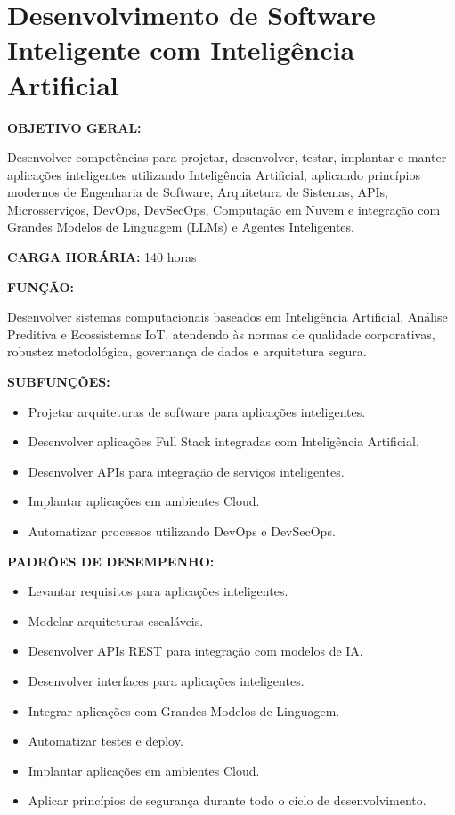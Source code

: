 \section{Desenvolvimento de Software Inteligente com Inteligência Artificial}

\textbf{OBJETIVO GERAL:}

Desenvolver competências para projetar, desenvolver, testar, implantar e manter aplicações inteligentes utilizando Inteligência Artificial, aplicando princípios modernos de Engenharia de Software, Arquitetura de Sistemas, APIs, Microsserviços, DevOps, DevSecOps, Computação em Nuvem e integração com Grandes Modelos de Linguagem (LLMs) e Agentes Inteligentes.

\textbf{CARGA HORÁRIA:} 140 horas

\textbf{FUNÇÃO:}

Desenvolver sistemas computacionais baseados em Inteligência Artificial, Análise Preditiva e Ecossistemas IoT, atendendo às normas de qualidade corporativas, robustez metodológica, governança de dados e arquitetura segura.

\textbf{SUBFUNÇÕES:}

\begin{itemize}
\item Projetar arquiteturas de software para aplicações inteligentes.
\item Desenvolver aplicações Full Stack integradas com Inteligência Artificial.
\item Desenvolver APIs para integração de serviços inteligentes.
\item Implantar aplicações em ambientes Cloud.
\item Automatizar processos utilizando DevOps e DevSecOps.
\end{itemize}

\textbf{PADRÕES DE DESEMPENHO:}

\begin{itemize}
\item Levantar requisitos para aplicações inteligentes.
\item Modelar arquiteturas escaláveis.
\item Desenvolver APIs REST para integração com modelos de IA.
\item Desenvolver interfaces para aplicações inteligentes.
\item Integrar aplicações com Grandes Modelos de Linguagem.
\item Automatizar testes e deploy.
\item Implantar aplicações em ambientes Cloud.
\item Aplicar princípios de segurança durante todo o ciclo de desenvolvimento.
\end{itemize}

